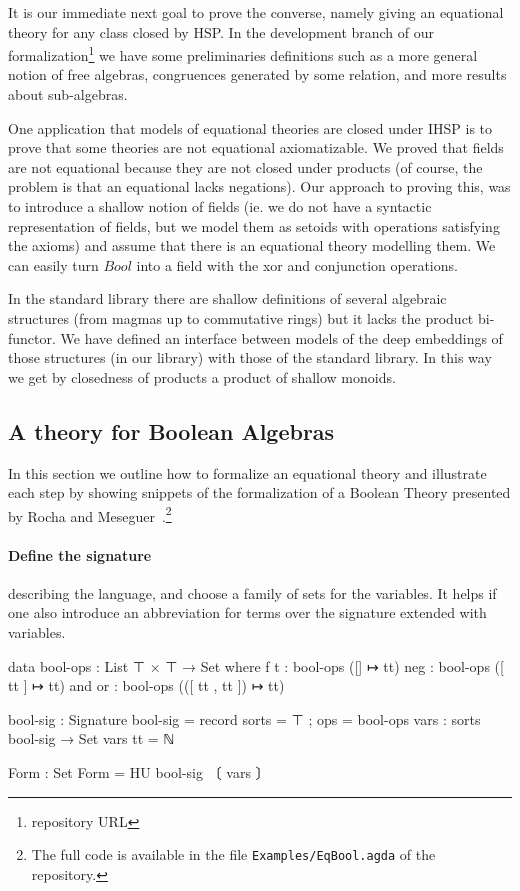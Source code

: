 
It is our immediate next goal to prove the converse, namely giving an
equational theory for any class closed by HSP. In the development
branch of our formalization\footnote{repository URL} we have some
preliminaries definitions such as a more general notion of free
algebras, congruences generated by some relation, and more results
about sub-algebras.

One application that models of equational theories are closed under
IHSP is to prove that some theories are not equational
axiomatizable. We proved that fields are not equational because they
are not closed under products (of course, the problem is that an
equational lacks negations). Our approach to proving this, was to
introduce a shallow notion of fields (ie. we do not have a syntactic
representation of fields, but we model them as setoids with operations
satisfying the axioms) and assume that there is an equational theory
modelling them. We can easily turn $\mathit{Bool}$ into a field with
the xor and conjunction operations. %

In the standard library there are shallow definitions of several
algebraic structures (from magmas up to commutative rings) but it
lacks the product bi-functor. We have defined an interface between
models of the deep embeddings of those structures (in our library)
with those of the standard library. In this way we get by closedness
of products a product of shallow monoids.

\subsection{A theory for Boolean Algebras } In this section we outline
how to formalize an equational theory and illustrate each step by
showing snippets of the formalization of a Boolean Theory presented by
Rocha and Meseguer~\cite{DBLP:conf/RelMiCS/RochaM08}.\footnote{The
  full code is available in the file \nolinkurl{Examples/EqBool.agda}
  of the repository.}

\paragraph*{Define the signature}
\label{sec:define-signature} describing the language, and choose
  a family of sets for the variables. It helps if one also introduce
  an abbreviation for terms over the signature extended with
  variables.
\begin{spec}
data bool-ops : List ⊤ × ⊤ → Set where
  f t    : bool-ops ([] ↦ tt)
  neg  : bool-ops ([ tt ] ↦ tt)
  and or  : bool-ops (([ tt , tt ]) ↦ tt)

bool-sig : Signature
bool-sig = record { sorts = ⊤ ; ops = bool-ops }
vars : sorts bool-sig → Set
vars tt = ℕ

Form : Set
Form = HU bool-sig 〔 vars 〕
\end{spec}

